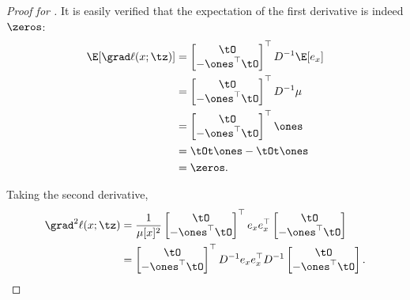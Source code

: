 \begin{proof}[Proof for ]
It is easily verified that the expectation of the first derivative is indeed $\zeros$:
\begin{align*}
  \E[\grad \ell(x; \tz)]
  &= 
  \begin{bmatrix}
    \tO \\
    -\ones^\top \tO
  \end{bmatrix}^\top
  D^{-1} \E[e_x] \\
  &= 
  \begin{bmatrix}
    \tO \\
    -\ones^\top \tO
  \end{bmatrix}^\top
  D^{-1} \mu \\
  &= 
  \begin{bmatrix}
    \tO \\
    -\ones^\top \tO
  \end{bmatrix}^\top
  \ones \\
  &= \tOt\ones - \tOt\ones \\
  &= \zeros.
\end{align*}

Taking the second derivative,
\begin{align}
  \grad^2 \ell(x; \tz)
  &= 
  \frac{
  1}{\mu[x]^2}
  \begin{bmatrix}
    \tO \\
    -\ones^\top \tO
  \end{bmatrix}^\top
 e_x e_x^\top 
  \begin{bmatrix}
    \tO \\
    -\ones^\top \tO
  \end{bmatrix}
  \nonumber
 \\ 
  &= 
  \begin{bmatrix}
    \tO \\
    -\ones^\top \tO
  \end{bmatrix}^\top
    D^{-1} e_x e_x^\top D^{-1} 
  \begin{bmatrix}
    \tO \\
    -\ones^\top \tO
  \end{bmatrix}. \label{eqn:lhood-hess}%
\end{align}


\end{proof}
